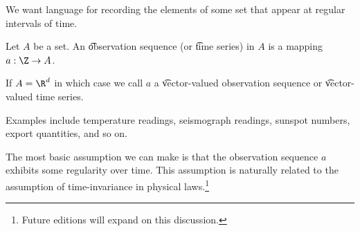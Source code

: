 

We want language for recording the elements of some set that appear at regular intervals of time.


Let $A$ be a set.
An \t{observation sequence} (or \t{time series}) in $A$ is a mapping $a: \Z \to A$.

If $A = \R^d$ in which case we call $a$ a \t{vector-valued observation sequence} or \t{vector-valued time series}.


Examples include temperature readings, seismograph readings, sunspot numbers, export quantities, and so on.


The most basic assumption we can make is that the observation sequence $a$ exhibits some regularity over time.
This assumption is naturally related to the assumption of time-invariance in physical laws.\footnote{Future editions will expand on this discussion.}



\blankpage
